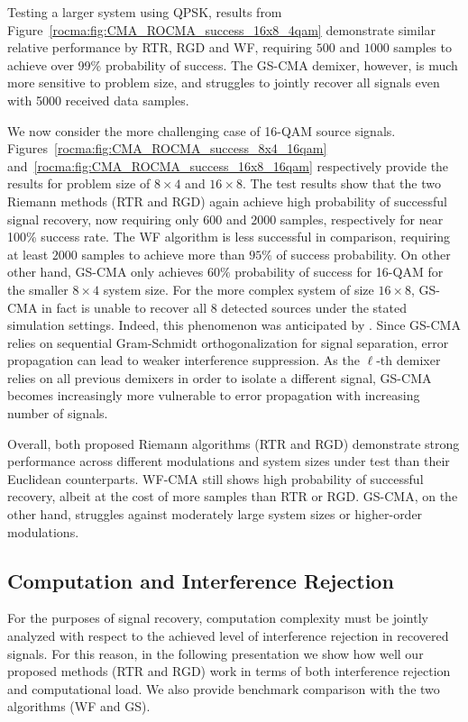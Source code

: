 Testing a larger system using QPSK, 
results from Figure~\ref{rocma:fig:CMA_ROCMA_success_16x8_4qam}
demonstrate similar relative performance
by RTR, RGD and WF, 
requiring $500$ and $1000$ samples to achieve over 99\% probability of success. 
The GS-CMA demixer, however, is much more
sensitive to problem size, and struggles to jointly recover all signals even with 5000
received data samples.

We now consider the more challenging
case of 16-QAM source signals. 
Figures~\ref{rocma:fig:CMA_ROCMA_success_8x4_16qam} and~\ref{rocma:fig:CMA_ROCMA_success_16x8_16qam} respectively provide the results for
problem size of $8\times 4$ and $16\times 8$.
The test results 
show that the
two Riemann methods (RTR and RGD) again
achieve high probability of
successful signal recovery, now requiring 
only $600$ and $2000$ samples, respectively
for near 100\% success rate. The WF algorithm 
is less successful in comparison,
requiring at least $2000$ samples to achieve more than $95\%$ of success probability. 
On other other hand, 
GS-CMA only achieves $60\%$ probability of success for 16-QAM 
for the smaller $8\times 4$ system size. 
For the more complex system of size
$16\times 8$, GS-CMA
in fact is unable to recover all 8 detected sources under the stated simulation settings. 
Indeed, this phenomenon was anticipated by \cite{Nguyen1997}. 
Since GS-CMA relies on sequential Gram-Schmidt orthogonalization for signal separation, 
error propagation can lead to weaker interference suppression. As the $\ell$-th demixer relies on all previous demixers in order to isolate a different signal, 
GS-CMA becomes increasingly more vulnerable to error propagation with increasing number of signals.

Overall, both proposed Riemann algorithms
(RTR and RGD) demonstrate strong performance across different modulations and system sizes under test than their Euclidean counterparts.
WF-CMA still shows high probability of  successful recovery, albeit at the
cost of more samples than RTR or RGD. 
GS-CMA, on the other hand, struggles
against moderately large system sizes or
higher-order modulations.


\subsection{Computation and Interference Rejection}\label{rocma:sim:complexity}
For the purposes of signal recovery, computation complexity must be jointly
analyzed with respect to the achieved
level of interference rejection in
recovered signals. 
For this reason, in the following presentation
we show how well our proposed methods (RTR and RGD) work in terms of both interference rejection and computational load.
We also provide benchmark
comparison with the two algorithms (WF and GS).

